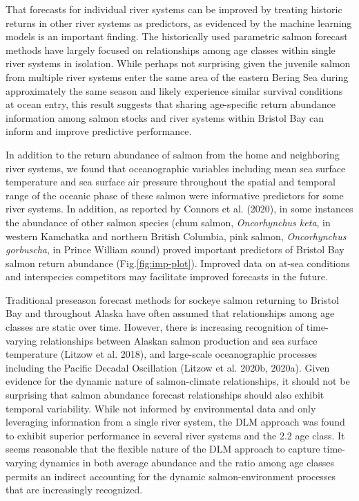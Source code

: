 \documentclass[
]{article}
\begin{document}
That forecasts for individual river systems can be improved by treating historic returns in other river systems as predictors, as evidenced by the machine learning models is an important finding. The historically used parametric salmon forecast methods have largely focused on relationships among age classes within single river systems in isolation. While perhaps not surprising given the juvenile salmon from multiple river systems enter the same area of the eastern Bering Sea during approximately the same season and likely experience similar survival conditions at ocean entry, this result suggests that sharing age-specific return abundance information among salmon stocks and river systems within Bristol Bay can inform and improve predictive performance.

In addition to the return abundance of salmon from the home and neighboring river systems, we found that oceanographic variables including mean sea surface temperature and sea surface air pressure throughout the spatial and temporal range of the oceanic phase of these salmon were informative predictors for some river systems. In addition, as reported by Connors et al. (2020), in some instances the abundance of other salmon species (chum salmon, \emph{Oncorhynchus keta}, in western Kamchatka and northern British Columbia, pink salmon, \emph{Oncorhynchus gorbuscha}, in Prince William sound) proved important predictors of Bristol Bay salmon return abundance (Fig.\ref{fig:imp-plot}). Improved data on at-sea conditions and interspecies competitors may facilitate improved forecasts in the future.

Traditional preseason forecast methods for sockeye salmon returning to Bristol Bay and throughout Alaska have often assumed that relationships among age classes are static over time. However, there is increasing recognition of time-varying relationships between Alaskan salmon production and sea surface temperature (Litzow et al. 2018), and large-scale oceanographic processes including the Pacific Decadal Oscillation (Litzow et al. 2020b, 2020a). Given evidence for the dynamic nature of salmon-climate relationships, it should not be surprising that salmon abundance forecast relationships should also exhibit temporal variability. While not informed by environmental data and only leveraging information from a single river system, the DLM approach was found to exhibit superior performance in several river systems and the 2.2 age class. It seems reasonable that the flexible nature of the DLM approach to capture time-varying dynamics in both average abundance and the ratio among age classes permits an indirect accounting for the dynamic salmon-environment processes that are increasingly recognized.
\end{document}
